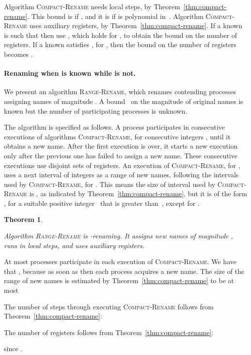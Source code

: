 \documentclass[11pt]{article}
\newcommand{\BBB}{\vspace*{-\bigskipamount}}
\newcommand{\Paragraph}[1]{\BBB\paragraph{#1}}
\newcommand{\qed}{\hfill  \smallbreak}
\newenvironment{proof}{\noindent{\bf Proof:}}{\qed}
\newtheorem{theorem}{Theorem}
\begin{document}
\begin{proof}
Algorithm \textsc{Compact-Rename} needs  local steps, by Theorem~\ref{thm:compact-rename}.
This bound is  if  , and it is   if  is polynomial in~.
Algorithm \textsc{Compact-Rename} uses  auxiliary registers, by Theorem~\ref{thm:compact-rename}.
If a known~ is such that  then use , which holds for , to obtain the bound  on the number of registers.  
If a known  satisfies , for , then the bound on the number of registers becomes .
\end{proof}



\Paragraph{Renaming when  is known while  is not.}


We present an algorithm  \textsc{Range-Rename}, which renames  contending processes assigning names of magnitude .
A bound~ on the magnitude of original names is known but the number of participating processes  is unknown. 

The algorithm is specified as follows.
A process participates in consecutive executions of algorithms \textsc{Compact-Rename}, for consecutive integers , until it obtains a new name. 
After the first execution is over, it starts a new execution only after the previous one has failed to assign a new name.
These consecutive executions use disjoint  sets of registers.
An execution of \textsc{Compact-Rename}, for , uses a next  interval of integers as a range of new names, following the intervals used by \textsc{Compact-Rename}, for . 
This means the size of interval used by \textsc{Compact-Rename} is , as indicated by Theorem~\ref{thm:compact-rename}, but it is of the form , for a suitable positive integer~ that is greater than~, except for .




\begin{theorem}
\label{thm:range-rename}

Algorithm \textsc{Range-Rename} is -renaming.
It assigns new names of magnitude , runs in  local steps, and uses  auxiliary registers.
\end{theorem}

\begin{proof}
At most  processes participate in each execution of \textsc{Compact-Rename}. We have that  , because as soon as  then each process acquires a new name.
The size of the range of new names is estimated by Theorem~\ref{thm:compact-rename} to be at most 

The number of steps through executing  \textsc{Compact-Rename} follows from Theorem~\ref{thm:compact-rename}:

The number of registers follows from Theorem~\ref{thm:compact-rename}:

 since .
\end{proof}
\end{document}
